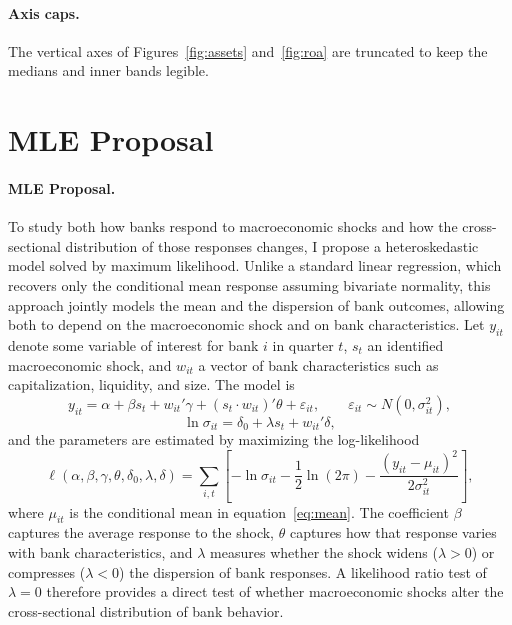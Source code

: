 \documentclass[11pt]{article}
\begin{document}
\paragraph{Axis caps.}
The vertical axes of Figures~\ref{fig:assets} and~\ref{fig:roa} are truncated to keep the medians and inner bands legible.

\section{MLE Proposal}\label{sec:methodology}

\paragraph{MLE Proposal.}
To study both how banks respond to macroeconomic shocks and how the
cross-sectional distribution of those responses changes, I propose a
heteroskedastic model solved by maximum likelihood. Unlike a
standard linear regression, which recovers only the conditional mean
response assuming bivariate normality, this approach jointly models the mean and the dispersion of bank
outcomes, allowing both to depend on the macroeconomic shock and on bank
characteristics. Let $y_{it}$ denote some variable of interest for bank $i$ in quarter $t$,
$s_t$ an identified macroeconomic shock, and $w_{it}$ a vector of bank
characteristics such as capitalization, liquidity, and size. The model is
\begin{equation}
    y_{it} = \alpha + \beta s_t + w_{it}'\gamma + (s_t \cdot w_{it})'\theta
    + \varepsilon_{it},
    \qquad \varepsilon_{it} \sim N\!\left(0, \sigma_{it}^2\right),
    \label{eq:mean}
\end{equation}
\begin{equation}
    \ln \sigma_{it} = \delta_0 + \lambda s_t + w_{it}'\delta,
    \label{eq:scale}
\end{equation}
and the parameters are estimated by maximizing the log-likelihood
\begin{equation}
    \ell(\alpha,\beta,\gamma,\theta,\delta_0,\lambda,\delta)
    = \sum_{i,t} \left[ -\ln \sigma_{it} - \frac{1}{2}\ln(2\pi)
    - \frac{\left(y_{it} - \mu_{it}\right)^2}{2\sigma_{it}^2} \right],
    \label{eq:loglik}
\end{equation}
where $\mu_{it}$ is the conditional mean in equation~\eqref{eq:mean}. The
coefficient $\beta$ captures the average response to the shock, $\theta$
captures how that response varies with bank characteristics, and $\lambda$
measures whether the shock widens ($\lambda > 0$) or compresses
($\lambda < 0$) the dispersion of bank responses. A likelihood ratio test of
$\lambda = 0$ therefore provides a direct test of whether macroeconomic
shocks alter the cross-sectional distribution of bank behavior.
\end{document}
